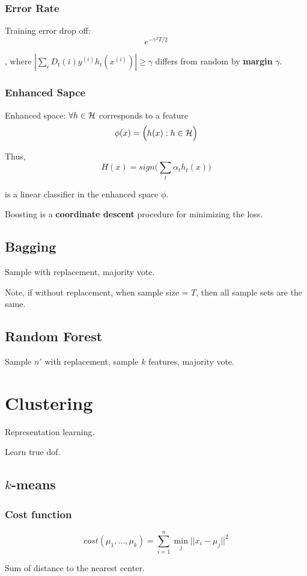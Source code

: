 \documentclass[a4paper]{report}
\begin{document}
\subsection{Error Rate}
Training error drop off:
$$
e^{-\gamma^2T/2}
$$

, where $|\sum_i D_t(i)y^{(i)}h_t(x^{(i)})|\geq \gamma$ differs from random by \textbf{margin} $\gamma$.

\subsection{Enhanced Sapce}
Enhanced space: $\forall h \in \mathcal{H}$ corresponds to a feature 
$$
\phi(x) = \Big(h(x):h\in \mathcal{H}\Big)
$$

Thus, 
$$
H(x) = sign\Big(\sum_t \alpha_t h_t(x)\Big)
$$

is a linear classifier in the enhanced space $\phi$. 

Boosting is a \textbf{coordinate descent} procedure for minimizing the loss.

\section{Bagging}
Sample with replacement, majority vote. 

Note, if without replacement, when sample size = $T$, then all sample sets are the same. 

\section{Random Forest}
Sample $n'$ with replacement, sample $k$ features, majority vote.

\chapter{Clustering}
Representation learning. 

Learn true dof. 

\section{$k$-means}
\subsection{Cost function}
$$
cost(\mu_1, ..., \mu_k) = \sum_{i=1}^n \min_j ||x_i-\mu_j||^2
$$

Sum of distance to the nearest center. 
\end{document}
